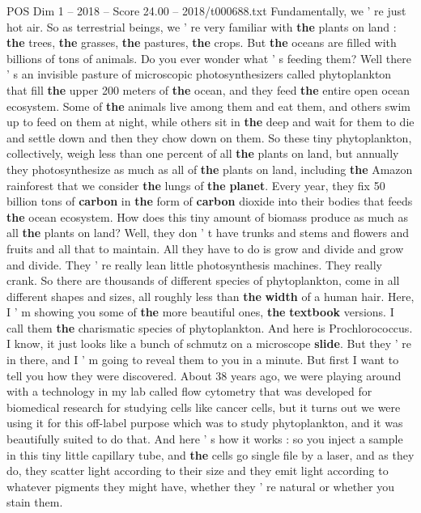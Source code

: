 \begin{textsample}{POS Dim 1 – 2018 – Score 24.00 – 2018/t000688.txt}
Fundamentally, we ' re just hot air.
So as terrestrial beings, we ' re very familiar with \textbf{the} plants on land : \textbf{the} trees, \textbf{the} grasses, \textbf{the} pastures, \textbf{the} crops.
But \textbf{the} oceans are filled with billions of tons of animals.
Do you ever wonder what ' s feeding them?
Well there ' s an invisible pasture of microscopic photosynthesizers called phytoplankton that fill \textbf{the} upper 200 meters of \textbf{the} ocean, and they feed \textbf{the} entire open ocean ecosystem.
Some of \textbf{the} animals live among them and eat them, and others swim up to feed on them at night, while others sit in \textbf{the} deep and wait for them to die and settle down and then they chow down on them.
So these tiny phytoplankton, collectively, weigh less than one percent of all \textbf{the} plants on land, but annually they photosynthesize as much as all of \textbf{the} plants on land, including \textbf{the} Amazon rainforest that we consider \textbf{the} lungs of \textbf{the} \textbf{planet}.
Every year, they fix 50 billion tons of \textbf{carbon} in \textbf{the} form of \textbf{carbon} dioxide into their bodies that feeds \textbf{the} ocean ecosystem.
How does this tiny amount of biomass produce as much as all \textbf{the} plants on land?
Well, they don ' t have trunks and stems and flowers and fruits and all that to maintain.
All they have to do is grow and divide and grow and divide.
They ' re really lean little photosynthesis machines.
They really crank.
So there are thousands of different species of phytoplankton, come in all different shapes and sizes, all roughly less than \textbf{the} \textbf{width} of a human hair.
Here, I ' m showing you some of \textbf{the} more beautiful ones, \textbf{the} \textbf{textbook} versions.
I call them \textbf{the} charismatic species of phytoplankton.
And here is Prochlorococcus.
I know, it just looks like a bunch of schmutz on a microscope \textbf{slide}.
But they ' re in there, and I ' m going to reveal them to you in a minute.
But first I want to tell you how they were discovered.
About 38 years ago, we were playing around with a technology in my lab called flow cytometry that was developed for biomedical research for studying cells like cancer cells, but it turns out we were using it for this off-label purpose which was to study phytoplankton, and it was beautifully suited to do that.
And here ' s how it works : so you inject a sample in this tiny little capillary tube, and \textbf{the} cells go single file by a laser, and as they do, they scatter light according to their size and they emit light according to whatever pigments they might have, whether they ' re natural or whether you stain them.

\end{textsample}
